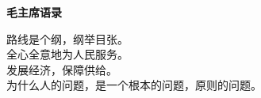 \begin{center}
\huge
{\bfseries
毛主席语录
}
\end{center}
\vspace{1.5\baselineskip}

\Large
路线是个纲，纲举目张。\\

全心全意地为人民服务。\\

发展经济，保障供给。\\

为什么人的问题，是一个根本的问题，原则的问题。\\

